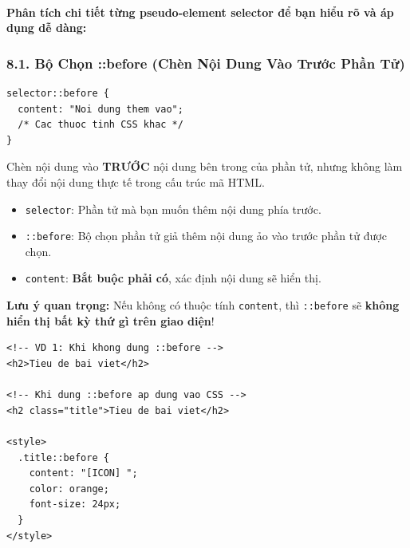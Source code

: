 \documentclass[11pt,oneside]{book}
\newcommand{\codeinline}[1]{\textcolor{accentOrange}{\texttt{#1}}}
\begin{document}
\paragraph{Phân tích chi tiết từng pseudo-element selector để bạn hiểu rõ và áp dụng dễ dàng:}

\subsubsection{8.1. Bộ Chọn ::before (Chèn Nội Dung Vào Trước Phần Tử)}

\begin{codeWindow}
\begin{lstlisting}[language=CSS3]
selector::before {
  content: "Noi dung them vao";
  /* Cac thuoc tinh CSS khac */
}
\end{lstlisting}
\end{codeWindow}

\begin{conceptBox}
Chèn nội dung vào \textbf{TRƯỚC} nội dung bên trong của phần tử, nhưng không làm thay đổi nội dung thực tế trong cấu trúc mã HTML.
\begin{itemize}[leftmargin=1.5em, itemsep=3pt, parsep=0pt]
    \item \codeinline{selector}: Phần tử mà bạn muốn thêm nội dung phía trước.
    \item \codeinline{::before}: Bộ chọn phần tử giả thêm nội dung ảo vào trước phần tử được chọn.
    \item \codeinline{content}: \textbf{Bắt buộc phải có}, xác định nội dung sẽ hiển thị.
\end{itemize}
\par\vspace{4pt}
\textbf{Lưu ý quan trọng:} Nếu không có thuộc tính \codeinline{content}, thì \codeinline{::before} sẽ \textbf{không hiển thị bất kỳ thứ gì trên giao diện}!
\end{conceptBox}

\begin{codeWindow}
\begin{lstlisting}[language=HTML5]
<!-- VD 1: Khi khong dung ::before -->
<h2>Tieu de bai viet</h2>

<!-- Khi dung ::before ap dung vao CSS -->
<h2 class="title">Tieu de bai viet</h2>

<style>
  .title::before {
    content: "[ICON] ";
    color: orange;
    font-size: 24px;
  }
</style>
\end{lstlisting}
\end{codeWindow}
\end{document}
